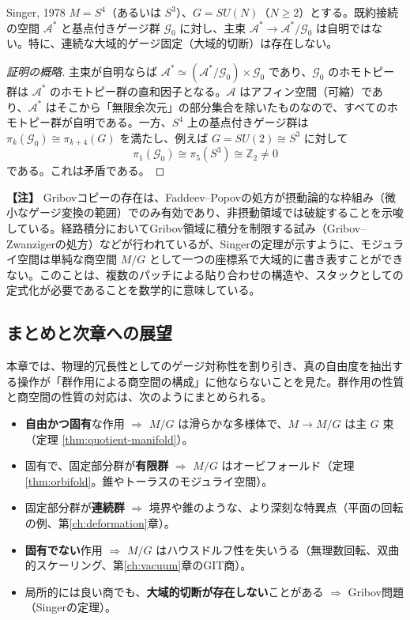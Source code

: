 \documentclass[uplatex, dvipdfmx, book]{jsbook}
\let\origsubsection\subsection
\let\origsubsubsection\subsubsection
\renewcommand{\section}{\origsubsection}
\renewcommand{\subsection}{\origsubsubsection}
\renewcommand{\subsubsection}{\paragraph}
\newenvironment{note}{\vspace{1ex}\par\footnotesize\noindent\textbf{【注】}}{\par\vspace{1ex}}
\begin{document}
\begin{mythm}{Singer, 1978}{}
$M = S^4$（あるいは $S^3$）、$G = SU(N)$（$N \ge 2$）とする。既約接続の空間 $\mathcal{A}^*$ と基点付きゲージ群 $\mathcal{G}_0$ に対し、主束 $\mathcal{A}^* \to \mathcal{A}^*/\mathcal{G}_0$ は自明ではない。特に、連続な大域的ゲージ固定（大域的切断）は存在しない。
\end{mythm}
\begin{proof}[証明の概略]
主束が自明ならば $\mathcal{A}^* \simeq (\mathcal{A}^*/\mathcal{G}_0) \times \mathcal{G}_0$ であり、$\mathcal{G}_0$ のホモトピー群は $\mathcal{A}^*$ のホモトピー群の直和因子となる。$\mathcal{A}$ はアフィン空間（可縮）であり、$\mathcal{A}^*$ はそこから「無限余次元」の部分集合を除いたものなので、すべてのホモトピー群が自明である。一方、$S^4$ 上の基点付きゲージ群は $\pi_k(\mathcal{G}_0) \cong \pi_{k+4}(G)$ を満たし、例えば $G = SU(2) \cong S^3$ に対して
\begin{equation*}
    \pi_1(\mathcal{G}_0) \cong \pi_5(S^3) \cong \mathbb{Z}_2 \neq 0
\end{equation*}
である。これは矛盾である。
\end{proof}

\begin{note}
Gribovコピーの存在は、Faddeev--Popovの処方が摂動論的な枠組み（微小なゲージ変換の範囲）でのみ有効であり、非摂動領域では破綻することを示唆している。経路積分においてGribov領域に積分を制限する試み（Gribov--Zwanzigerの処方）などが行われているが、Singerの定理が示すように、モジュライ空間は単純な商空間 $M/G$ として一つの座標系で大域的に書き表すことができない。このことは、複数のパッチによる貼り合わせの構造や、スタックとしての定式化が必要であることを数学的に意味している。
\end{note}

\section{まとめと次章への展望}

本章では、物理的冗長性としてのゲージ対称性を割り引き、真の自由度を抽出する操作が「群作用による商空間の構成」に他ならないことを見た。群作用の性質と商空間の性質の対応は、次のようにまとめられる。
\begin{itemize}
    \item \textbf{自由かつ固有}な作用 $\Rightarrow$ $M/G$ は滑らかな多様体で、$M \to M/G$ は主 $G$ 束（定理 \ref{thm:quotient-manifold}）。
    \item 固有で、固定部分群が\textbf{有限群} $\Rightarrow$ $M/G$ はオービフォールド（定理 \ref{thm:orbifold}。錐やトーラスのモジュライ空間）。
    \item 固定部分群が\textbf{連続群} $\Rightarrow$ 境界や錐のような、より深刻な特異点（平面の回転の例、第\ref{ch:deformation}章）。
    \item \textbf{固有でない}作用 $\Rightarrow$ $M/G$ はハウスドルフ性を失いうる（無理数回転、双曲的スケーリング、第\ref{ch:vacuum}章のGIT商）。
    \item 局所的には良い商でも、\textbf{大域的切断が存在しない}ことがある $\Rightarrow$ Gribov問題（Singerの定理）。
\end{itemize}
\end{document}
